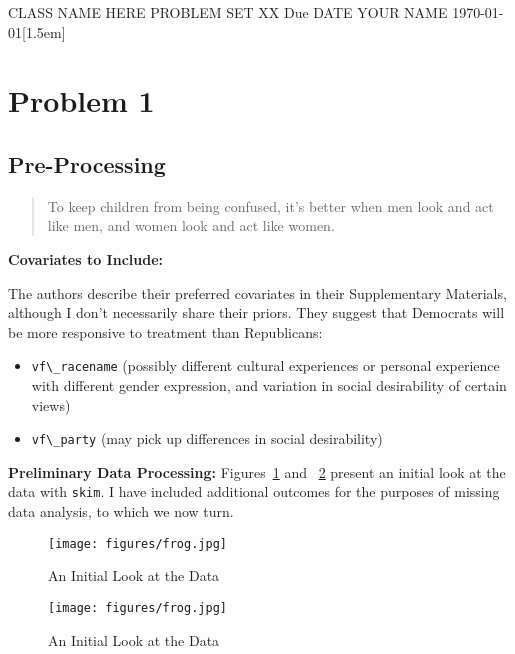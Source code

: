 \noindent
\Large CLASS NAME HERE  
 	\large PROBLEM SET XX  
 	\large Due DATE 
 	\large YOUR NAME
 	\today  [1.5em] %
 

\section{Problem 1}


\subsection{Pre-Processing}

 
    \begin{quote}
    To keep children from being confused, it's better when men look and act like men, and women look and act like women.    
    \end{quote} 
    
    
\textbf{Covariates to Include:}
    
    The authors describe their preferred covariates in their Supplementary Materials, although I don't necessarily share their priors. They suggest that Democrats will be more responsive to treatment than Republicans:
    \begin{itemize}
        \item \verb+vf\_racename+ (possibly different cultural experiences or personal experience with different gender expression, and variation in social desirability of certain views)
        \item \verb+vf\_party+ (may pick up differences in social desirability)
    \end{itemize}
    
    \textbf{Preliminary Data Processing:}
    Figures~\ref{fig:hw-04_q-01a_data-skim_keepvars-01} and ~\ref{fig:hw-04_q-01a_data-skim_keepvars-02} present an initial look at the data with \verb+skim+. I have included additional outcomes for the purposes of missing data analysis, to which we now turn. 
    

    \begin{figure}[H]
	\centering %
	\texttt{[image: figures/frog.jpg]}
	\caption{An Initial Look at the Data} 
	\label{fig:hw-04_q-01a_data-skim_keepvars-01}
    \end{figure}
    
        \begin{figure}[H]
	\centering %
	\texttt{[image: figures/frog.jpg]}
	\caption{An Initial Look at the Data} 
	\label{fig:hw-04_q-01a_data-skim_keepvars-02}
    \end{figure}

